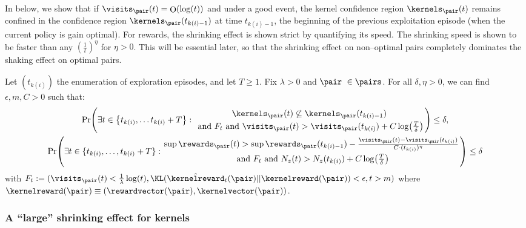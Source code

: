 \documentclass[preprint,cleveref,12pt]{colt2025}
\DeclarePairedDelimiter{\braces}{\{}{\}}	%
\DeclarePairedDelimiter{\parens}{(}{)}	%
\DeclareMathOperator*{\OH}{\mathrm{O}}
\def\kernel{\kernelvector}
\def\kerrew{\kernelreward}
\def\reward{\rewardvector}
\begin{document}
    In  below, we show that if $\visits_\pair (t) = \OH(\log(t))$ and under a good event, the kernel confidence region $\kernels_\pair (t)$ remains confined in the confidence region $\kernels_\pair (t_{k(i)-1})$ at time $t_{k(i)-1}$, the beginning of the previous {exploitation} episode (when the current policy is gain optimal). 
    For rewards, the shrinking effect is shown strict by quantifying its speed.
    The shrinking speed is shown to be faster than any $(\frac 1t)^\eta$ for $\eta > 0$.
    This will be essential later, so that the shrinking effect on non--optimal pairs completely dominates the shaking effect on optimal pairs.

    \begin{lemma}
    \label{lemma_shrinking}
        Let $(t_{k(i)})$ the enumeration of exploration episodes, and let $T \ge 1$.
        Fix $\lambda > 0$ and $\pair \in \pairs$.
        For all $\delta, \eta > 0$, we can find $\epsilon, m, C > 0$ such that:
        \begin{equation*}
        \begin{gathered}
            \Pr \parens*{
                \exists t \in \braces*{t_{k(i)}, \ldots t_{k(i)}+T}
                :
                {
                    \kernels_\pair(t) \not \subseteq \kernels_\pair(t_{k(i)-1}) 
                    \atop
                    \text{~and~}
                    F_t \text{~and~}
                    \visits_\pair(t) > \visits_\pair(t_{k(i)}) + C \log\parens*{\tfrac T\delta}
                }
            }
            \le \delta,
            \\
            \Pr \parens*{
                \exists t \in \braces{t_{k(i)}, \ldots, t_{k(i)}+T}
                :
                {
                    \sup \rewards_\pair(t) > \sup \rewards_\pair(t_{k(i)-1}) - \tfrac{\visits_\pair(t) - \visits_\pair(t_{k(i)})}{C \cdot (t_{k(i)})^\eta}
                    \atop
                    \text{~and~} F_t \text{~and~}
                    N_z(t) > N_z(t_{k(i)}) + C \log\parens*{\tfrac T\delta}
                }
            }
            \le \delta
        \end{gathered}
        \end{equation*}
        with $F_{t} := (\visits_\pair(t) < \frac 1\lambda \log(t), \KL(\hat{\kerrew}_t(\pair)||\kerrew(\pair)) < \epsilon, t > m)$ where $\kerrew(\pair) \equiv (\reward(\pair), \kernel(\pair))$. 
    \end{lemma}

    \subsubsection{A ``large'' shrinking effect for kernels}
\end{document}
